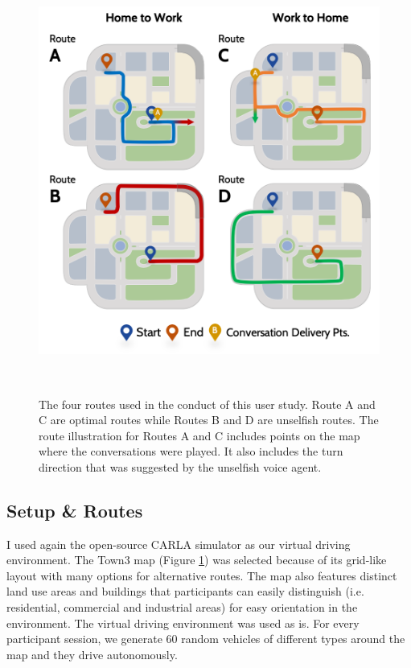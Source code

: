 \begin{figure}[t]
\centering
  \includegraphics[scale=.7]{figures/s4-all-routes.png}
  \caption{The four routes used in the conduct of this user study. Route A and C are optimal routes while Routes B and D are unselfish routes. The route illustration for Routes A and C includes points on the map where the conversations were played. It also includes the turn direction that was suggested by the unselfish voice agent.}~\label{fig:s4-allroutes}
\end{figure}

\subsection{Setup \& Routes}
I used again the open-source CARLA simulator \cite{Dosovitskiy17} as our virtual driving environment. The Town3 map (Figure \ref{fig:s4-allroutes}) was selected because of its grid-like layout with many options for alternative routes. The map also features distinct land use areas and buildings that participants can easily distinguish (i.e. residential, commercial and industrial areas) for easy orientation in the environment. The virtual driving environment was used as is. For every participant session, we generate 60 random vehicles of different types around the map and they drive autonomously. 

